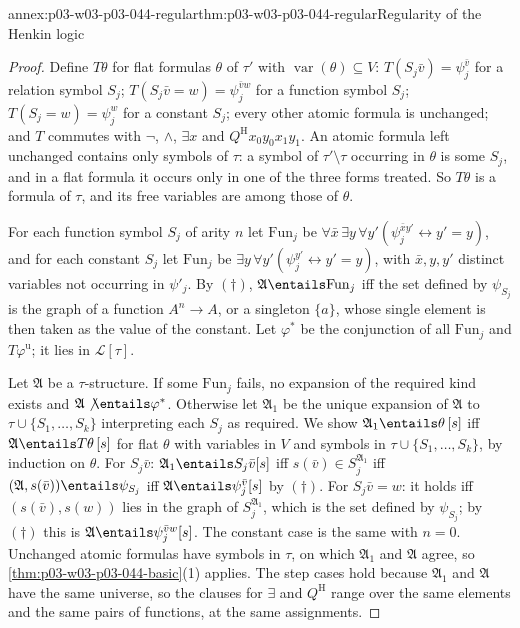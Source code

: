 \begin{annexitem}{annex:p03-w03-p03-044-regular}{thm:p03-w03-p03-044-regular}{Regularity of the Henkin logic}
\begin{proof}
Define \(T\theta\) for flat formulas \(\theta\) of \(\tau'\) with
\(\operatorname{var}(\theta)\subseteq V\):
\(T(S_j\bar v)=\psi_j^{\bar v}\) for a relation symbol \(S_j\);
\(T(S_j\bar v=w)=\psi_j^{\bar vw}\) for a function symbol \(S_j\);
\(T(S_j=w)=\psi_j^{w}\) for a constant \(S_j\); every other atomic formula
is unchanged; and \(T\) commutes with \(\neg\), \(\land\), \(\exists x\) and
\(Q^{\mathrm H}x_0y_0x_1y_1\).  An atomic formula left unchanged contains
only symbols of \(\tau\): a symbol of \(\tau'\setminus\tau\) occurring in
\(\theta\) is some \(S_j\), and in a flat formula it occurs only in one of
the three forms treated.  So \(T\theta\) is a formula of \(\tau\), and its
free variables are among those of \(\theta\).

For each function symbol \(S_j\) of arity \(n\) let \(\mathrm{Fun}_j\) be
\(\forall\bar x\,\exists y\,\forall y'(\psi_j^{\bar xy'}\leftrightarrow
y'=y)\), and for each constant \(S_j\) let \(\mathrm{Fun}_j\) be
\(\exists y\,\forall y'(\psi_j^{y'}\leftrightarrow y'=y)\), with
\(\bar x,y,y'\) distinct variables not occurring in \(\psi'_j\).  By
\((\dagger)\), \(\mathfrak A\entails\mathrm{Fun}_j\) iff the set defined by
\(\psi_{S_j}\) is the graph of a function \(A^n\to A\), or a singleton
\(\{a\}\), whose single element is then taken as the value of the constant.
Let \(\varphi^\ast\) be the conjunction of all \(\mathrm{Fun}_j\) and
\(T\varphi^{\mathrm u}\); it lies in \(\mathscr L[\tau]\).

Let \(\mathfrak A\) be a \(\tau\)-structure.  If some \(\mathrm{Fun}_j\)
fails, no expansion of the required kind exists and
\(\mathfrak A\not\entails\varphi^\ast\).  Otherwise let \(\mathfrak A_1\) be
the unique expansion of \(\mathfrak A\) to \(\tau\cup\{S_1,\ldots,S_k\}\)
interpreting each \(S_j\) as required.  We show
\(\mathfrak A_1\entails\theta\,[s]\) iff \(\mathfrak A\entails
T\theta\,[s]\) for flat \(\theta\) with variables in \(V\) and symbols in
\(\tau\cup\{S_1,\ldots,S_k\}\), by induction on \(\theta\).  For
\(S_j\bar v\): \(\mathfrak A_1\entails S_j\bar v[s]\) iff \(s(\bar v)\in
S_j^{\mathfrak A_1}\) iff \((\mathfrak A,s(\bar v))\entails\psi_{S_j}\) iff
\(\mathfrak A\entails\psi_j^{\bar v}[s]\) by \((\dagger)\).  For
\(S_j\bar v=w\): it holds iff \((s(\bar v),s(w))\) lies in the graph of
\(S_j^{\mathfrak A_1}\), which is the set defined by \(\psi_{S_j}\); by
\((\dagger)\) this is \(\mathfrak A\entails\psi_j^{\bar vw}[s]\).  The
constant case is the same with \(n=0\).  Unchanged atomic formulas have
symbols in \(\tau\), on which \(\mathfrak A_1\) and \(\mathfrak A\) agree,
so \cref{thm:p03-w03-p03-044-basic}(1) applies.  The step cases hold
because \(\mathfrak A_1\) and \(\mathfrak A\) have the same universe, so
the clauses for \(\exists\) and \(Q^{\mathrm H}\) range over the same
elements and the same pairs of functions, at the same assignments.


\end{proof}
\end{annexitem}
